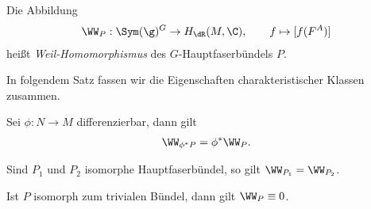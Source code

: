 \documentclass[%
	paper=a5,%
	fleqn,%
	DIV=18,%
	BCOR=0mm,
	fontsize=11pt,
	titlepage=false,%
	bibliography=totoc,
	DIV=18,%
	twoside=true,
	pdftitle=Riemannsche Geometrie,
	pdfauthor=Uwe Semmelmann,
	numbers=noendperiod]%
	{scrbook}
\begin{document}
\begin{defn}
Die Abbildung
\begin{align*}
\WW_P : \Sym(\g)^G \to H_{\dR}(M,\C),\qquad f \mapsto [f(F^A)]
\end{align*}
heißt \emph{Weil-Homomorphismus} des $G$-Hauptfaserbündels $P$.\fish
\end{defn}

In folgendem Satz fassen wir die Eigenschaften charakteristischer Klassen
zusammen.

\begin{prop}
\begin{propenum}
\item Sei $\phi: N\to M$ differenzierbar, dann gilt
\begin{align*}
\WW_{\phi^* P} = \phi^*\WW_P.
\end{align*}
\item Sind $P_1$ und $P_2$ isomorphe Hauptfaserbündel, so gilt $\WW_{P_1} =
\WW_{P_2}$.
\item Ist $P$ isomorph zum trivialen Bündel, dann gilt $\WW_P\equiv 0$.\fish
\end{propenum}


\end{prop}
\end{document}
